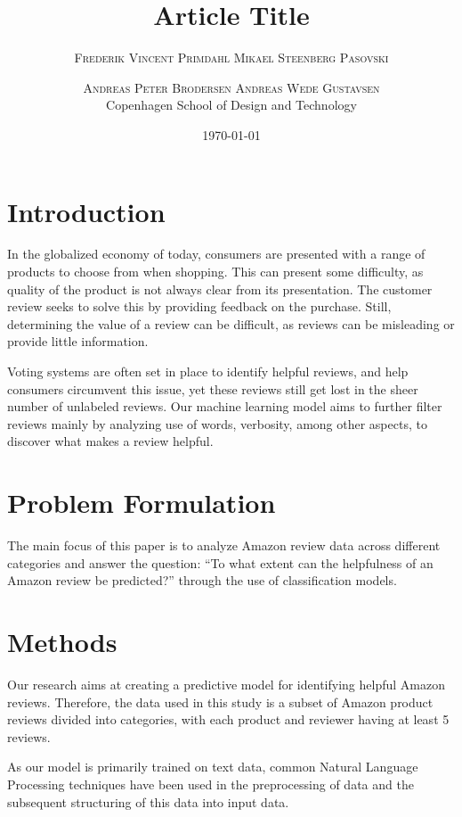 \documentclass[twoside,twocolumn]{article}
\title{Article Title} %
\author{%
\textsc{Frederik Vincent Primdahl} \textsc{Mikael Steenberg Pasovski} \and \textsc{Andreas Peter Brodersen} \textsc{Andreas Wede Gustavsen} \\[1ex] %
\normalsize Copenhagen School of Design and Technology \\ %
}
\date{\today} %
\begin{document}
\maketitle


\section{Introduction}
In the globalized economy of today, consumers are presented with a range of products to choose from when shopping. This can present some difficulty, as quality of the product is not always clear from its presentation. The customer review seeks to solve this by providing feedback on the purchase. Still, determining the value of a review can be difficult, as reviews can be misleading or provide little information.

Voting systems are often set in place to identify helpful reviews, and help consumers circumvent this issue, yet these reviews still get lost in the sheer number of unlabeled reviews. Our machine learning model aims to further filter reviews mainly by analyzing use of words, verbosity, among other aspects, to discover what makes a review helpful.

\section{Problem Formulation}

The main focus of this paper is to analyze Amazon review data across different categories and answer the question: “To what extent can the helpfulness of an Amazon review be predicted?” through the use of classification models.

\section{Methods}
Our research aims at creating a predictive model for identifying helpful Amazon reviews. Therefore, the data used in this study is a subset of Amazon product reviews divided into categories, with each product and reviewer having at least 5 reviews.

As our model is primarily trained on text data, common Natural Language Processing techniques have been used in the preprocessing of data and the subsequent structuring of this data into input data.
\end{document}
